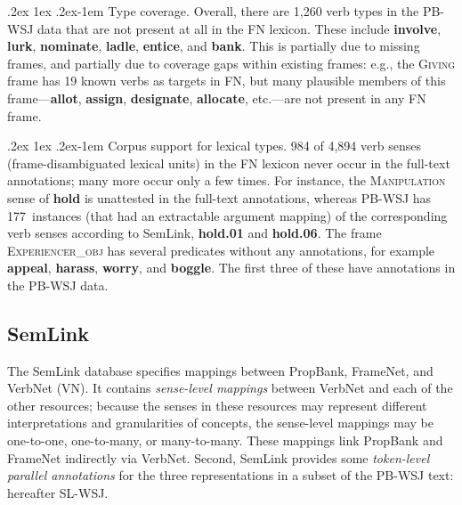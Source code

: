 \documentclass[11pt]{article}
\makeatletter
\newcommand{\ensuretext}[1]{#1}
\newcommand{\nssmarker}{\ensuretext{\textcolor{magenta}{\ensuremath{^{\textsc{NS}}_{\textsc{S}}}}}}
\newcommand{\arkcomment}[3]{\ensuretext{\textcolor{#3}{[#1 #2]}}}
\newcommand{\nss}[1]{\arkcomment{\nssmarker}{#1}{magenta}}
\renewcommand{\paragraph}{%
  \@startsection{paragraph}{4}%
  {\z@}{.2ex \@plus 1ex \@minus .2ex}{-1em}%
  {\normalfont\normalsize\bfseries}%
}
\newcommand{\finalversion}[1]{}
\newcommand{\vpred}[1]{\textbf{#1}} %
\newcommand{\fname}[1]{\textsc{#1}} %
\makeatother
\begin{document}
\paragraph{Type coverage.}
Overall, there are 1,260 verb types in the PB-WSJ data that are not present at all in the FN lexicon. 
These include \vpred{involve}, \vpred{lurk}, \vpred{nominate}, \vpred{ladle}, \vpred{entice}, and \vpred{bank}.
This is partially due to missing frames, and partially due to coverage gaps within existing frames:
e.g., the \fname{Giving} frame has 19 known verbs as targets in FN, but  
many plausible members of this frame---\vpred{allot}, \vpred{assign}, \vpred{designate}, \vpred{allocate}, etc.---are not present in any FN frame. 

\paragraph{Corpus support for lexical types.} 984 of 4,894 verb senses (frame-disambiguated lexical units) in the FN lexicon 
never occur in the full-text annotations; many more occur only a few times.\finalversion{\nss{how many verb *types* occur at least once in PB?}}
For instance, the \fname{Manipulation} sense of \vpred{hold} is unattested in the full-text annotations,
whereas PB-WSJ has 177~instances (that had an extractable argument mapping) of the corresponding 
verb senses according to SemLink, \vpred{hold.01} and \vpred{hold.06}.
The frame \fname{Experiencer\_obj} has several predicates without any annotations, 
for example \vpred{appeal}, \vpred{harass}, \vpred{worry}, and \vpred{boggle}. 
The first three of these have annotations in the PB-WSJ data. 

\subsection{SemLink}\label{sec:semlink}

The SemLink database \citep{semlink} specifies mappings between PropBank, FrameNet, and VerbNet (VN). 
It contains \emph{sense-level mappings} between VerbNet and each of the other resources; 
because the senses in these resources may represent different interpretations and granularities of concepts, 
the sense-level mappings may be one-to-one, one-to-many, or many-to-many.
These mappings link PropBank and FrameNet indirectly via VerbNet. %
Second, SemLink provides some \emph{token-level parallel annotations} 
for the three representations in a subset of the PB-WSJ text: hereafter SL-WSJ.
\end{document}
